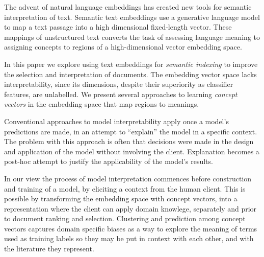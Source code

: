 The advent of natural language embeddings has created new tools for semantic interpretation of text. Semantic text embeddings use a generative language model to map a text passage into a high dimensional fixed-length vector. These mappings of unstructured text converts the task of assessing language meaning to assigning concepts to regions of a high-dimensional vector embedding space.

In this paper we explore using text embeddings for {\it semantic indexing} to improve the selection and interpretation of documents. The embedding vector space lacks interpretability, since its dimensions, despite their superiority  as classifier features, are unlabelled. We present several approaches to learning {\it concept vectors} in the embedding space that map regions to meanings. 

Conventional approaches to model interpretability apply once a model's predictions are made, in an attempt to ``explain'' the model in a specific context.  The problem with this approach is often that decisions were made in the design and application of the model without involving the client. Explanation becomes a post-hoc attempt to justify the applicability of the model's results. 

In our view the process of model interpretation commences before construction and training of a model, by eliciting a context from the human client. 
This is possible by transforming the embedding space with concept vectors, into a representation where the client can apply domain knowlege, separately and prior to document ranking and selection. Clustering and prediction among concept vectors captures domain specific biases as a way to 
explore the meaning of terms used as training labels so they may be put in context with each other, and with the literature they represent. 

